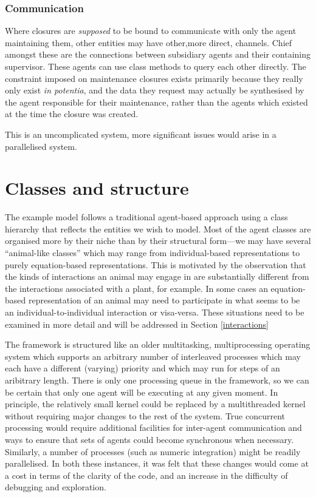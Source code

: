 \subsubsection{Communication}

Where closures are \emph{supposed} to be bound to communicate with
only the agent maintaining them, other entities may have other,more
direct, channels. Chief amongst these are the connections between
subsidiary agents and their containing supervisor.  These agents can
use class methods to query each other directly. The constraint imposed
on maintenance closures exists primarily because they really only
exist \emph{in potentia}, and the data they request may actually be
synthesised by the agent responsible for their maintenance, rather
than the agents which existed at the time the closure was created.

This is an uncomplicated system, more significant issues would arise
in a parallelised system.  


\section{Classes and structure}

The example model follows a traditional agent-based approach using a
class hierarchy that reflects the entities we wish to model. Most of
the agent classes are organised more by their niche than by their
structural form---we may have several ``animal-like classes'' which
may range from individual-based representations to purely
equation-based representations. This is motivated by the observation
that the kinds of interactions an animal may engage in are
substantially different from the interactions associated with a plant,
for example.  In some cases an equation-based representation of an
animal may need to participate in what seems to be an
individual-to-individual interaction or visa-versa.  These situations
need to be examined in more detail and will be addressed in Section
\ref{interactions}


The framework is structured like an older multitasking,
multiprocessing operating system which supports an arbitrary number of
interleaved processes which may each have a different (varying)
priority and which may run for steps of an aribitrary length. There is
only one processing queue in the framework, so we can be certain that
only one agent will be executing at any given moment.  In principle,
the relatively small kernel could be replaced by a multithreaded
kernel without requiring major changes to the rest of the system. True
concurrent processing would require additional facilities for
inter-agent communication and ways to ensure that sets of agents could
become synchronous when necessary. Similarly, a number of processes
(such as numeric integration) might be readily parallelised.  In both
these instances, it was felt that these changes would come at a cost
in terms of the clarity of the code, and an increase in the difficulty
of debugging and exploration.

